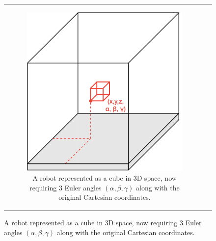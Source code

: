\begin{figure}[H]
\begin{center}
\begin{tabular}{cc}
\begin{subfigure}{0.4\textwidth}
\begin{center}
    \includegraphics[width=\linewidth]{chapters/chapter2/img/motionPlanning/3DCubeConfiguration.png}
    \caption{A robot represented as a cube in 3D space, now requiring 3 Euler angles $(\alpha, \beta, \gamma)$ along with the original Cartesian coordinates.}
    \label{subfig:3DCubeConfig}
    \end{center}
    \end{subfigure} \\
\end{tabular}
    \label{fig:configuration}

\end{center}
\end{figure}